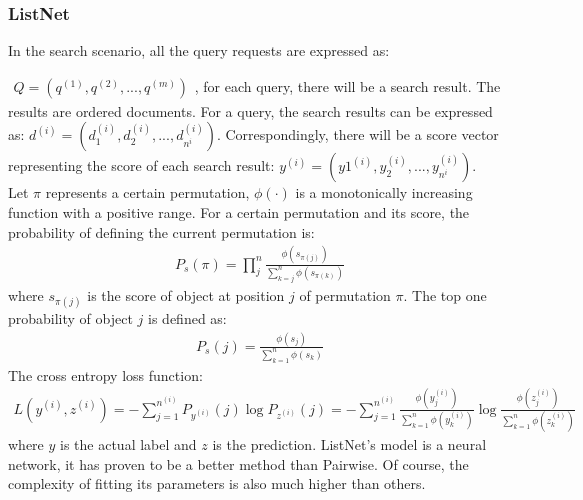 \subsubsection{ListNet}
In the search scenario, all the query requests are expressed as:

$\begin{matrix} Q= \left ( q^{(1)},q^{(2)},...,q^{(m)} \right ) \end{matrix}$, for each query, there will be a search result. The results are ordered documents. For a query, the search results can be expressed as: $d^{(i)}=\left ( d_1^{(i)}, d_2^{(i)},...,d_{n^i}^{(i)}\right)$. Correspondingly, there will be a score vector representing the score of each search result: $y^{(i)}=\left ( y1^{(i)},y_2^{(i)},...,y_{n^i}^{(i)}\right )$. 
\\
Let $\pi$ represents a certain permutation, $\phi(\cdot )$ is a monotonically increasing function with a positive range. For a certain permutation and its score, the probability of defining the current permutation is:
\begin{equation}
\begin{aligned}
P_s(\pi)=\prod_j^n \frac{\phi(s_{\pi(j)})}{\sum_{k=j}^n \phi(s_{\pi(k)})}
\end{aligned}
\label{eqn:eq15}
\end{equation}
where $s_{\pi(j)}$ is the score of object at position $j$ of permutation $\pi$. The top one probability of object $j$
is defined as:
\begin{equation}
\begin{aligned}
P_s(j) = \frac{\phi(s_j)}{\sum_{k=1}^n \phi(s_k)}
\end{aligned}
\label{eqn:eq16}
\end{equation}
The cross entropy loss function:
\begin{equation}
\begin{aligned}
L(y^{(i)}, z^{(i)}) = - \sum_{j=1}^{n^{(i)}} P_{y^{(i)}}(j) \log P_{z^{(i)}}(j) = - \sum_{j=1}^{n^{(i)}} \frac{\phi(y_j^{(i)})}{\sum_{k=1}^n \phi(y_k^{(i)})} \log \frac{\phi(z_j^{(i)})}{\sum_{k=1}^n \phi(z_k^{(i)})}\end{aligned}
\label{eqn:eq16}
\end{equation}
where $y$ is the actual label and $z$ is the prediction.
ListNet's model is a neural network, it has proven to be a better method than Pairwise. Of course, the complexity of fitting its parameters is also much higher than others.

\newpage
